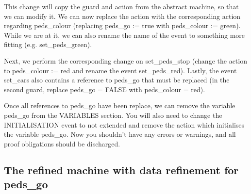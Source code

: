 This change will copy the guard and action from the abstract machine, so that we can modify it.  We can now replace the action with the corresponding action regarding \textsf{peds\_colour} (replacing \textsf{peds\_go := true} with \textsf{peds\_colour := green}).  While we are at it, we can also rename the name of the event to something more fitting (e.g. \textsf{set\_peds\_green}).

Next, we perform the corresponding change on \textsf{set\_peds\_stop} (change the action to \textsf{peds\_colour := red} and rename the event \textsf{set\_peds\_red}). Lastly, the event \textsf{set\_cars} also contains a reference to \textsf{peds\_go} that must be replaced (in the second guard, replace \textsf{peds\_go = FALSE} with \textsf{peds\_colour = red}).

Once all references to \textsf{peds\_go} have been replace, we can remove the variable \textsf{peds\_go} from the \textsf{VARIABLES} section. You will also need to change the \textsf{INITIALISATION} event to \textsf{not extended} and remove the action which initialises the variable \textsf{peds\_go}. Now you shouldn't have any errors or warnings, and all proof obligations should be discharged.


\subsection{The refined machine with data refinement for peds\_go}
\label{tut_refined_machine}

